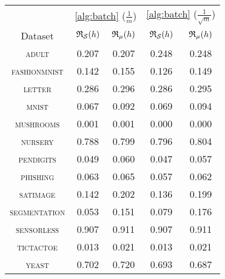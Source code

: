 \begin{tabular}{c|cc|cc}
\toprule
 & \multicolumn{2}{c}{\cref{alg:batch} {\small ($\frac{1}{m}$)}} & \multicolumn{2}{c}{\cref{alg:batch} {\small ($\frac{1}{\sqrt{m}}$)}} \\
Dataset & {\scriptsize $\mathfrak{R}_{\mathcal{S}}(h)$} & {\scriptsize $\mathfrak{R}_{\mu}(h)$} & {\scriptsize $\mathfrak{R}_{\mathcal{S}}(h)$} & {\scriptsize $\mathfrak{R}_{\mu}(h)$} \\
\midrule
\textsc{\footnotesize adult} & 0.207 & 0.207 & 0.248 & 0.248 \\
\textsc{\footnotesize fashionmnist} & 0.142 & 0.155 & 0.126 & 0.149 \\
\textsc{\footnotesize letter} & 0.286 & 0.296 & 0.286 & 0.295 \\
\textsc{\footnotesize mnist} & 0.067 & 0.092 & 0.069 & 0.094 \\
\textsc{\footnotesize mushrooms} & 0.001 & 0.001 & 0.000 & 0.000 \\
\textsc{\footnotesize nursery} & 0.788 & 0.799 & 0.796 & 0.804 \\
\textsc{\footnotesize pendigits} & 0.049 & 0.060 & 0.047 & 0.057 \\
\textsc{\footnotesize phishing} & 0.063 & 0.065 & 0.057 & 0.062 \\
\textsc{\footnotesize satimage} & 0.142 & 0.202 & 0.136 & 0.199 \\
\textsc{\footnotesize segmentation} & 0.053 & 0.151 & 0.079 & 0.176 \\
\textsc{\footnotesize sensorless} & 0.907 & 0.911 & 0.907 & 0.911 \\
\textsc{\footnotesize tictactoe} & 0.013 & 0.021 & 0.013 & 0.021 \\
\textsc{\footnotesize yeast} & 0.702 & 0.720 & 0.693 & 0.687 \\
\bottomrule
\end{tabular}
